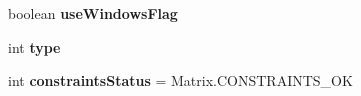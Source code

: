 \begin{DoxyCompactItemize}
\item 
boolean {\bfseries use\+Windows\+Flag}\hypertarget{classheneticmethod_1_1_matrix_aa5b3e3dc57b016241012f50cc524455d}{}\label{classheneticmethod_1_1_matrix_aa5b3e3dc57b016241012f50cc524455d}

\item 
int {\bfseries type}\hypertarget{classheneticmethod_1_1_matrix_aa2148fb1883626cb503f36f84b05cf0a}{}\label{classheneticmethod_1_1_matrix_aa2148fb1883626cb503f36f84b05cf0a}

\item 
int {\bfseries constraints\+Status} = Matrix.\+C\+O\+N\+S\+T\+R\+A\+I\+N\+T\+S\+\_\+\+OK\hypertarget{classheneticmethod_1_1_matrix_a646a08becaf0fcb5174091bbfcfc415c}{}\label{classheneticmethod_1_1_matrix_a646a08becaf0fcb5174091bbfcfc415c}

\end{DoxyCompactItemize}
